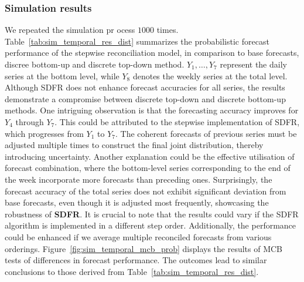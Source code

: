\documentclass[a4paper,review,12pt,authoryear]{elsarticle}
\begin{document}
     \subsubsection{Simulation results}
     We repeated the simulation pr ocess $1000$ times.
     Table~\ref{tab:sim_temporal_res_dist} summarizes the probabilistic forecast performance of the stepwise reconciliation model, in comparison to base forecasts, discree bottom-up and discrete top-down method.
     $Y_1,\dots,Y_7$ represent the daily series at the bottom level, while $Y_8$ denotes the weekly series at the total level.
     Although SDFR does not enhance forecast accuracies for all series, the results
     demonstrate a compromise between discrete top-down and discrete bottom-up methods. 
     One intriguing observation is that the forecasting accuracy improves for $Y_4$ through $Y_7$. 
     This could be attributed to the stepwise implementation of SDFR, which progresses from $Y_1$ to $Y_7$. The coherent forecasts of previous series must be adjusted multiple times to construct the final joint distribution, thereby introducing uncertainty.
     Another explanation could be the effective utilisation of forecast combination, where the bottom-level series corresponding to the end of the week incorporate more forecasts than preceding ones.
     Surprisingly, the forecast accuracy of the total series does not exhibit significant deviation from base forecasts,  even though it is adjusted most frequently, showcasing the robustness of \textbf{SDFR}.
     It is crucial to note that the results could vary if the SDFR algorithm is implemented in a different step order.
     Additionally, the performance could be enhanced if we average multiple reconciled forecasts from various orderings.
     Figure~\ref{fig:sim_temporal_mcb_prob} displays the results of MCB tests of differences in forecast performance. The outcomes lead to similar conclusions to those derived from Table~\ref{tab:sim_temporal_res_dist}. 
     
\end{document}
